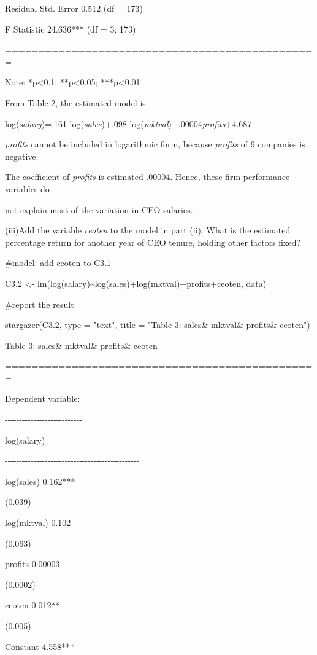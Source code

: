 \documentclass[
]{article}
\begin{document}
Residual Std. Error 0.512 (df = 173)

F Statistic 24.636*** (df = 3; 173)

===============================================

Note: *p\textless0.1; **p\textless0.05; ***p\textless0.01

From Table 2, the estimated model is

log(\emph{salary})=.161 log(\emph{sales})+.098
log(\emph{mktval})+.00004\emph{profits}+4.687

\emph{profits} cannot be included in logarithmic form, because
\emph{profits} of 9 companies is negative.

The coefficient of \emph{profits} is estimated .00004. Hence, these firm
performance variables do

not explain most of the variation in CEO salaries.

(iii)Add the variable \emph{ceoten} to the model in part (ii). What is
the estimated percentage return for another year of CEO tenure, holding
other factors fixed?

\#model: add ceoten to C3.1

C3.2 \textless-
lm(log(salary)\textasciitilde log(sales)+log(mktval)+profits+ceoten,
data)

\#report the result

stargazer(C3.2, type = "text", title = "Table 3: sales\& mktval\&
profits\& ceoten")

Table 3: sales\& mktval\& profits\& ceoten

===============================================

Dependent variable:

-\/-\/-\/-\/-\/-\/-\/-\/-\/-\/-\/-\/-\/-\/-\/-\/-\/-\/-\/-\/-\/-\/-\/-\/-\/-\/-

log(salary)

-\/-\/-\/-\/-\/-\/-\/-\/-\/-\/-\/-\/-\/-\/-\/-\/-\/-\/-\/-\/-\/-\/-\/-\/-\/-\/-\/-\/-\/-\/-\/-\/-\/-\/-\/-\/-\/-\/-\/-\/-\/-\/-\/-\/-\/-\/-

log(sales) 0.162***

(0.039)

log(mktval) 0.102

(0.063)

profits 0.00003

(0.0002)

ceoten 0.012**

(0.005)

Constant 4.558***
\end{document}
